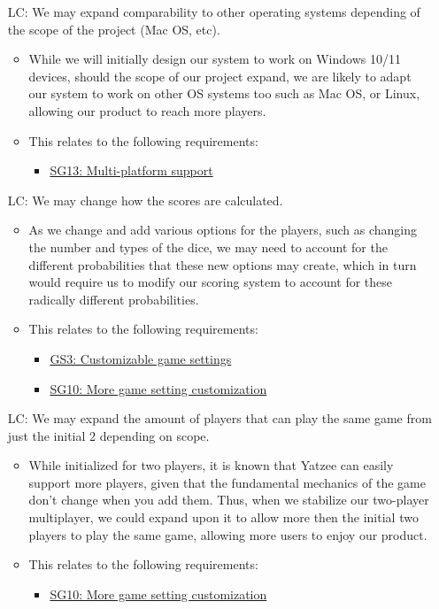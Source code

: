 \begin{itemize}
\item[LC\refstepcounter{lcnum}\thelcnum \label{LC_platforms}:] We may expand comparability to other operating systems depending of the scope of the project (Mac OS, etc).

\begin{itemize}
	\item While we will initially design our system to work on Windows 10/11 devices, should the scope of our project expand, we are likely to adapt our system to work on other OS systems too such as Mac OS, or Linux, allowing our product to reach more players.
	\item This relates to the following requirements: 
	\begin{itemize}
		\item \hyperref[G_platforms]{SG13: Multi-platform support}
	\end{itemize}
\end{itemize}

\item[LC\refstepcounter{lcnum}\thelcnum \label{LC_score_calc}:] We may change how the scores are calculated.

\begin{itemize}
	\item As we change and add various options for the players, such as changing the number and types of the dice, we may need to account for the different probabilities that these new options may create, which in turn would require us to modify our scoring system to account for these radically different probabilities.
	\item This relates to the following requirements: 
	\begin{itemize}
		\item \hyperref[G_customization]{GS3: Customizable game settings}
		\item \hyperref[G_customization2]{SG10: More game setting customization}
	\end{itemize}
\end{itemize}

\item[LC\refstepcounter{lcnum}\thelcnum \label{LC_num_players}:] We may expand the amount of players that can play the same game from just the initial 2 depending on scope.

\begin{itemize}
	\item While initialized for two players, it is known that Yatzee can easily support more players, given that the fundamental mechanics of the game don't change when you add them. Thus, when we stabilize our two-player multiplayer, we could expand upon it to allow more then the initial two players to play the same game, allowing more users to enjoy our product.
	\item This relates to the following requirements: 
	\begin{itemize}
		\item \hyperref[G_customization2]{SG10: More game setting customization}
	\end{itemize}
\end{itemize}


\end{itemize}
